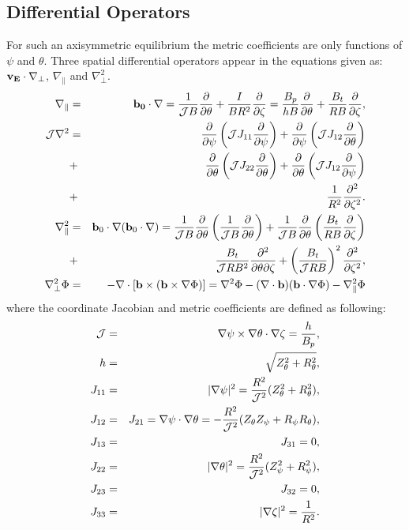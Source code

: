 \documentclass [11pt]{article}
\begin{document}
\newpage
\subsection{Differential Operators}
For such an axisymmetric equilibrium the metric coefficients are only functions of $\psi$ and $\theta$. Three spatial 
differential operators appear in the equations given as: ${\bf v_E}\cdot\nabla_\perp$, $\nabla_\|$ and 
$\nabla_\perp^2$.
\begin{eqnarray}
\nabla_\|&=&{\bf b_0}\cdot\nabla={1\over {\cal J}B}{\partial\over\partial\theta}+{I\over BR^2}{\partial\over\partial\zeta}={B_p\over hB}{\partial\over\partial\theta}+{B_t\over RB}{\partial\over\partial\zeta}, \\
{\cal J}\nabla^2&=&
{\partial\over\partial\psi}\left({\cal J}J_{11}{\partial\over\partial\psi}\right)
+{\partial\over\partial\psi}\left({\cal J}J_{12}{\partial\over\partial\theta}\right) \nonumber\\
&+&{\partial\over\partial\theta}\left({\cal J}J_{22}{\partial\over\partial\theta}\right)
+{\partial\over\partial\theta}\left({\cal J}J_{12}{\partial\over\partial\psi}\right)  \nonumber\\
&+&{1\over R^2}{\partial^2\over\partial\zeta^2}. \\
\nabla_\|^2&=&{\bf b}_0\cdot\nabla({\bf b}_0\cdot\nabla)={1\over {\cal J}B}{\partial\over\partial\theta}\left({1\over {\cal J}B}{\partial\over\partial\theta}\right)
+{1\over {\cal J}B}{\partial\over\partial\theta}\left({B_t\over RB}{\partial\over\partial\zeta}\right) \\
&+&{B_t\over {\cal J}RB^2}{\partial^2\over\partial\theta\partial\zeta}
+\left({B_t\over {\cal J}RB}\right)^2{\partial^2\over\partial\zeta^2}, \\
\nabla_\perp^2\Phi&=&-\nabla\cdot[{\bf b}\times({\bf b}\times\nabla\Phi)]=\nabla^2\Phi-(\nabla\cdot{\bf b})({\bf b}\cdot\nabla\Phi)-\nabla_\|^2\Phi
\end{eqnarray}
where the coordinate Jacobian and metric coefficients are defined as following:
\begin{eqnarray}
{\cal J}&=&\nabla\psi\times\nabla\theta\cdot\nabla\zeta={h\over B_p}, \\
h&=&\sqrt{Z_\theta^2+R_\theta^2}, \\
J_{11}&=&|\nabla\psi|^2={R^2\over {\cal J}^2}(Z_\theta^2+R_\theta^2), \\
J_{12}&=&J_{21}=\nabla\psi\cdot\nabla\theta=-{R^2\over {\cal J}^2}(Z_\theta Z_\psi+R_\psi R_\theta), \\
J_{13}&=&J_{31}=0, \\
J_{22}&=&|\nabla\theta|^2={R^2\over {\cal J}^2}(Z_\psi^2+R_\psi^2), \\
J_{23}&=&J_{32}=0, \\
J_{33}&=&|\nabla\zeta|^2={1\over R^2}.
\end{eqnarray}
\end{document}
